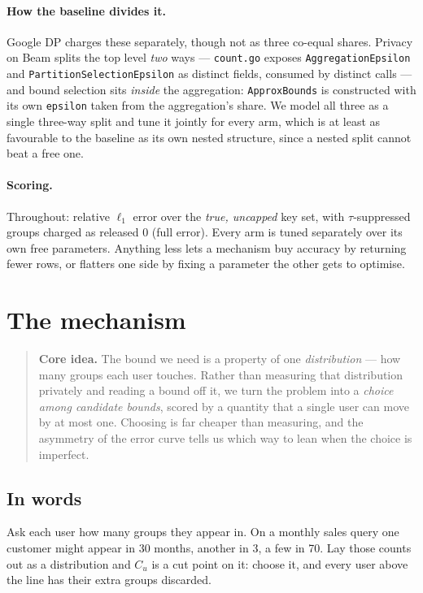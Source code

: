 \documentclass[11pt,a4paper]{article}
\newcommand{\Cu}{C_u}
\begin{document}
\paragraph{How the baseline divides it.} Google DP charges these separately, though not as three
co-equal shares. Privacy on Beam splits the top level \emph{two} ways --- \texttt{count.go} exposes
\texttt{AggregationEpsilon} and \texttt{PartitionSelectionEpsilon} as distinct fields, consumed by
distinct calls --- and bound selection sits \emph{inside} the aggregation: \texttt{ApproxBounds} is
constructed with its own \texttt{epsilon} taken from the aggregation's share. We model all three as
a single three-way split and tune it jointly for every arm, which is at least as favourable to the
baseline as its own nested structure, since a nested split cannot beat a free one.

\paragraph{Scoring.} Throughout: relative $\ell_1$ error over the \emph{true, uncapped} key set,
with $\tau$-suppressed groups charged as released $0$ (full error). Every arm is tuned separately
over its own free parameters. Anything less lets a mechanism buy accuracy by returning fewer rows,
or flatters one side by fixing a parameter the other gets to optimise.

\section{The mechanism}

\begin{quote}
\textbf{Core idea.} The bound we need is a property of one \emph{distribution} --- how many groups
each user touches. Rather than measuring that distribution privately and reading a bound off it, we
turn the problem into a \emph{choice among candidate bounds}, scored by a quantity that a single
user can move by at most one. Choosing is far cheaper than measuring, and the asymmetry of the
error curve tells us which way to lean when the choice is imperfect.
\end{quote}

\subsection{In words}

Ask each user how many groups they appear in. On a monthly sales query one customer might appear in
30 months, another in 3, a few in 70. Lay those counts out as a distribution and $\Cu$ is a cut
point on it: choose it, and every user above the line has their extra groups discarded.
\end{document}
